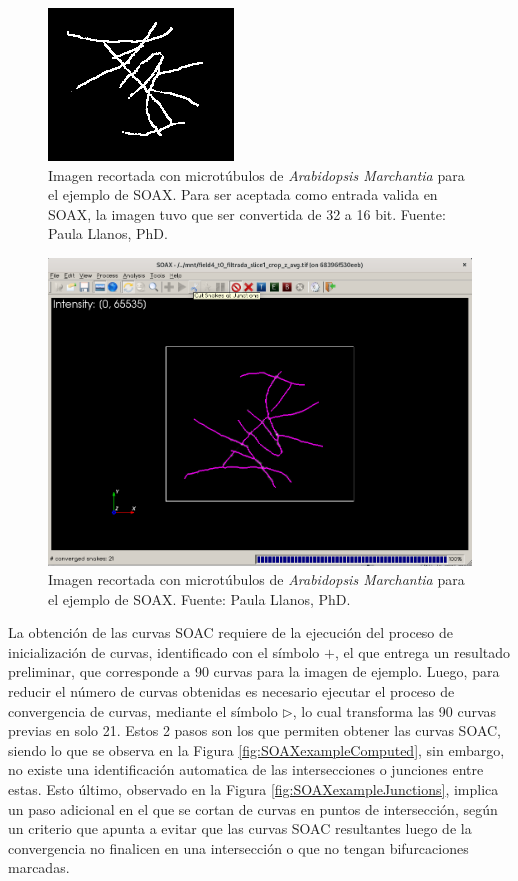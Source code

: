 \begin{figure}[h]
    \centering
    \includegraphics[scale=0.8]{evalImages/field4-t0-z-avg.png}
    \caption[Imagen de ejemplo de SOAX]{Imagen recortada con microt\'ubulos de {\it Arabidopsis Marchantia} para el ejemplo de SOAX. Para ser aceptada como entrada valida en SOAX, la imagen tuvo que ser convertida de 32 a 16 bit. Fuente: Paula Llanos, PhD.}
    \label{fig:SOAXexample}
\end{figure}


\begin{figure}[h]
    \centering
    \includegraphics[scale=0.3]{evalImages/field4-soax.png}
    \caption[Imagen de ejemplo de SOAX]{Imagen recortada con microt\'ubulos de {\it Arabidopsis Marchantia} para el ejemplo de SOAX. Fuente: Paula Llanos, PhD.}
    \label{fig:SOAXexample}
\end{figure}

La obtenci\'on de las curvas SOAC requiere de la ejecuci\'on del proceso de inicializaci\'on de curvas, identificado con el s\'imbolo $+$, el que entrega un resultado preliminar, que corresponde a 90 curvas para la imagen de ejemplo. Luego, para reducir el n\'umero de curvas obtenidas es necesario ejecutar el proceso de convergencia de curvas, mediante el s\'imbolo $\rhd$, lo cual transforma las 90 curvas previas en solo 21. Estos 2 pasos son los que permiten obtener las curvas SOAC, siendo lo que se observa en la Figura \ref{fig:SOAXexampleComputed}, sin embargo, no existe una identificaci\'on automatica de las intersecciones o junciones entre estas. Esto \'ultimo, observado en la Figura \ref{fig:SOAXexampleJunctions}, implica un paso adicional en el que se cortan de curvas en puntos de intersecci\'on, seg\'un un criterio que apunta a evitar que las curvas SOAC resultantes luego de la convergencia no finalicen en una intersecci\'on o que no tengan bifurcaciones marcadas.


